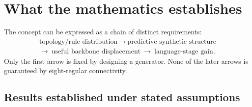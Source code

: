 \section{What the mathematics establishes}
\label{sec:conclusions}

The concept can be expressed as a chain of distinct requirements:
\begin{equation}
 \begin{gathered}
 \text{topology/rule distribution}
 \ \longrightarrow\
 \text{predictive synthetic structure}\\
 \longrightarrow\
 \text{useful backbone displacement}
 \ \longrightarrow\
 \text{language-stage gain}.
 \end{gathered}
\end{equation}
Only the first arrow is fixed by designing a generator.
None of the later arrows is guaranteed by eight-regular connectivity.

\subsection{Results established under stated assumptions}

